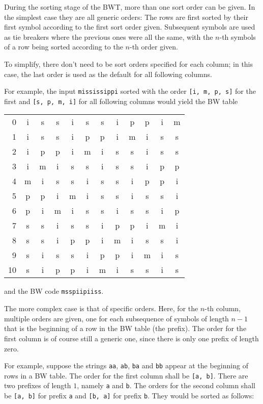 \documentclass[a4paper]{scrreprt}
\begin{document}
During the sorting stage of the BWT, more than one sort order can be given. In
the simplest case they are all generic orders: The rows are first sorted by
their first symbol according to the first sort order given. Subsequent symbols
are used as tie breakers where the previous ones were all the same, with the
\(n\)-th symbols of a row being sorted according to the \(n\)-th order given.

To simplify, there don't need to be sort orders specified for each column; in
this case, the last order is used as the default for all following columns.

For example, the input \texttt{mississippi} sorted with the order \texttt{[i, m,
p, s]} for the first and \texttt{[s, p, m, i]} for all following columns would
yield the BW table

\begin{tabular}{|r||ccccccccccc|}
\hline
0 & i & s & s & i & s & s & i & p & p & i & m \\
1 & i & s & s & i & p & p & i & m & i & s & s \\
2 & i & p & p & i & m & i & s & s & i & s & s \\
3 & i & m & i & s & s & i & s & s & i & p & p \\
4 & m & i & s & s & i & s & s & i & p & p & i \\
5 & p & p & i & m & i & s & s & i & s & s & i \\
6 & p & i & m & i & s & s & i & s & s & i & p \\
7 & s & s & i & s & s & i & p & p & i & m & i \\
8 & s & s & i & p & p & i & m & i & s & s & i \\
9 & s & i & s & s & i & p & p & i & m & i & s \\
10 & s & i & p & p & i & m & i & s & s & i & s \\
\hline
\end{tabular}

and the BW code \texttt{msspiipiiss}.

The more complex case is that of specific orders. Here, for the \(n\)-th column,
multiple orders are given, one for each subsequence of symbols of length \(n -
1\) that is the beginning of a row in the BW table (the prefix). The order
for the first column is of course still a generic one, since there is only one
prefix of length zero.

For example, suppose the strings \texttt{aa}, \texttt{ab}, \texttt{ba} and
\texttt{bb} appear at the beginning of rows in a BW table. The order for the
first column shall be \texttt{[a, b]}. There are two prefixes of length \(1\),
namely \texttt{a} and \texttt{b}. The orders for the second column shall be
\texttt{[a, b]} for prefix \texttt{a} and \texttt{[b, a]} for prefix \texttt{b}.
They would be sorted as follows:
\end{document}
